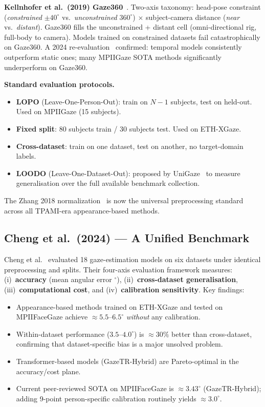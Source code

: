\documentclass[11pt,a4paper]{article}
\begin{document}
\textbf{Kellnhofer et al.\ (2019) Gaze360}~\cite{kellnhofer2019gaze360}.
Two-axis taxonomy: head-pose constraint (\emph{constrained} $\pm40^\circ$ vs.\ \emph{unconstrained} $360^\circ$)
$\times$ subject-camera distance (\emph{near} vs.\ \emph{distant}).
Gaze360 fills the unconstrained + distant cell (omni-directional rig, full-body to camera).
Models trained on constrained datasets fail catastrophically on Gaze360.
A 2024 re-evaluation~\cite{sikic2024reevaluation} confirmed: temporal models consistently
outperform static ones; many MPIIGaze SOTA methods significantly underperform on Gaze360.

\textbf{Standard evaluation protocols.}
\begin{itemize}
  \item \textbf{LOPO} (Leave-One-Person-Out): train on $N-1$ subjects, test on held-out. Used on MPIIGaze (15 subjects).
  \item \textbf{Fixed split}: 80 subjects train / 30 subjects test. Used on ETH-XGaze.
  \item \textbf{Cross-dataset}: train on one dataset, test on another, no target-domain labels.
  \item \textbf{LOODO} (Leave-One-Dataset-Out): proposed by UniGaze~\cite{unigaze2025}
        to measure generalisation over the full available benchmark collection.
\end{itemize}
The Zhang 2018 normalization~\cite{zhang2018revisiting} is now the universal
preprocessing standard across all TPAMI-era appearance-based methods.

\subsection{Cheng et al.\ (2024) --- A Unified Benchmark}

Cheng et al.~\cite{cheng2024survey} evaluated 18 gaze-estimation models on six datasets under identical preprocessing and splits.
Their four-axis evaluation framework measures: (i)~\textbf{accuracy} (mean angular error $^\circ$),
(ii)~\textbf{cross-dataset generalisation}, (iii)~\textbf{computational cost}, and (iv)~\textbf{calibration sensitivity}.
Key findings:
\begin{itemize}
  \item Appearance-based methods trained on ETH-XGaze and tested on MPIIFaceGaze achieve $\approx5.5$--$6.5^\circ$
        \emph{without} any calibration.
  \item Within-dataset performance ($3.5$--$4.0^\circ$) is $\approx30\%$ better than cross-dataset,
        confirming that dataset-specific bias is a major unsolved problem.
  \item Transformer-based models (GazeTR-Hybrid) are Pareto-optimal in the accuracy/cost plane.
  \item Current peer-reviewed SOTA on MPIIFaceGaze is $\approx3.43^\circ$ (GazeTR-Hybrid);
        adding 9-point person-specific calibration routinely yields $\approx3.0^\circ$.
\end{itemize}
\end{document}
